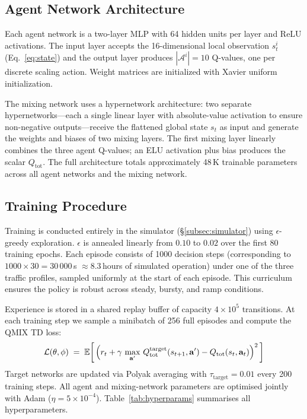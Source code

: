 \documentclass[conference]{IEEEtran}
\begin{document}
\subsection{Agent Network Architecture}

Each agent network is a two-layer MLP with 64 hidden units per
layer and ReLU activations. The input layer accepts the
16-dimensional local observation $s_t^i$ (Eq.~\ref{eq:state}) and
the output layer produces $|\mathcal{A}^i| = 10$ Q-values, one per
discrete scaling action. Weight matrices are initialized with
Xavier uniform initialization.

The mixing network uses a hypernetwork architecture: two separate
hypernetworks---each a single linear layer with absolute-value
activation to ensure non-negative outputs---receive the flattened
global state $s_t$ as input and generate the weights and biases of
two mixing layers. The first mixing layer linearly combines the
three agent Q-values; an ELU activation plus bias produces the
scalar $Q_{\mathrm{tot}}$. The full architecture totals
approximately 48\,K trainable parameters across all agent networks
and the mixing network.

\subsection{Training Procedure}

Training is conducted entirely in the simulator
(\S\ref{subsec:simulator}) using $\epsilon$-greedy exploration.
$\epsilon$ is annealed linearly from $0.10$ to $0.02$ over the first
80 training epochs. Each episode consists of 1000 decision
steps (corresponding to $1000 \times 30 = 30\,000$\,s $\approx 8.3$\,hours
of simulated operation) under one of the three traffic profiles,
sampled uniformly at the start of each episode. This curriculum
ensures the policy is robust across steady, bursty, and ramp
conditions.

Experience is stored in a shared replay buffer of capacity
$4\times10^5$ transitions. At each training step we sample a
minibatch of 256 full episodes and compute the QMIX TD loss:
\begin{equation}
  \mathcal{L}(\theta,\phi) \;=\;
  \mathbb{E}\!\left[\,
    \Bigl(r_t + \gamma\,\max_{\mathbf{a}'}\,
      Q_{\mathrm{tot}}^{\text{target}}(s_{t+1}, \mathbf{a}')
    - Q_{\mathrm{tot}}(s_t, \mathbf{a}_t)\Bigr)^2
  \,\right]
  \label{eq:loss}
\end{equation}
Target networks are updated via Polyak averaging with
$\tau_{\mathrm{target}} = 0.01$ every 200 training steps.
All agent and mixing-network parameters are optimised jointly with
Adam ($\eta = 5\times10^{-4}$). Table~\ref{tab:hyperparams}
summarises all hyperparameters.
\end{document}
